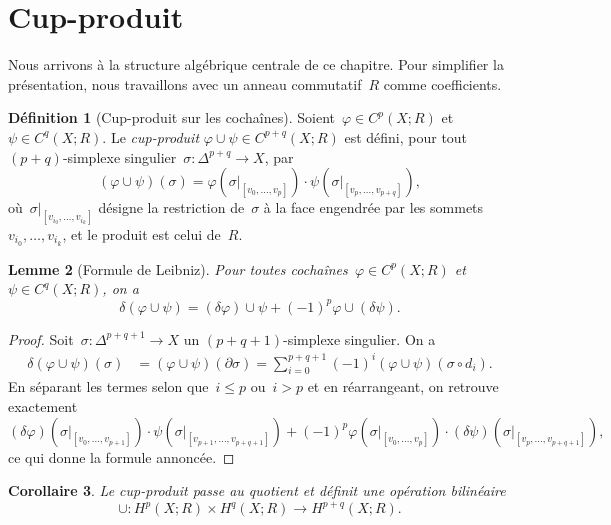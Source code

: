 \documentclass[12pt,a4paper,openany]{book}
\theoremstyle{definition}
\newtheorem{definition}{Définition}[chapter]
\theoremstyle{plain}
\newtheorem{lemme}[definition]{Lemme}
\newtheorem{corollaire}[definition]{Corollaire}
\theoremstyle{remark}
\begin{document}
\section{Cup-produit}\label{sec:cup-produit}

Nous arrivons à la structure algébrique centrale de ce chapitre. Pour simplifier la
présentation, nous travaillons avec un anneau commutatif~$R$ comme coefficients.

\begin{definition}[Cup-produit sur les cochaînes]\label{def:cup-cochaines}
Soient~$\varphi \in C^p(X; R)$ et~$\psi \in C^q(X; R)$. Le \emph{cup-produit}
$\varphi \cup \psi \in C^{p+q}(X; R)$ est défini, pour tout $(p+q)$-simplexe
singulier~$\sigma \colon \Delta^{p+q} \to X$, par
\[
  (\varphi \cup \psi)(\sigma)
  = \varphi(\sigma|_{[v_0, \ldots, v_p]}) \cdot \psi(\sigma|_{[v_p, \ldots, v_{p+q}]}),
\]
où~$\sigma|_{[v_{i_0}, \ldots, v_{i_k}]}$ désigne la restriction de~$\sigma$ à la face
engendrée par les sommets~$v_{i_0}, \ldots, v_{i_k}$, et le produit est celui de~$R$.
\end{definition}

\begin{lemme}[Formule de Leibniz]\label{lem:leibniz-cup}
Pour toutes cochaînes~$\varphi \in C^p(X; R)$ et~$\psi \in C^q(X; R)$, on a
\[
  \delta(\varphi \cup \psi) = (\delta\varphi) \cup \psi
  + (-1)^p \varphi \cup (\delta\psi).
\]
\end{lemme}

\begin{proof}
Soit~$\sigma \colon \Delta^{p+q+1} \to X$ un $(p+q+1)$-simplexe singulier. On a
\begin{align*}
  \delta(\varphi \cup \psi)(\sigma)
  &= (\varphi \cup \psi)(\partial \sigma)
  = \sum_{i=0}^{p+q+1} (-1)^i (\varphi \cup \psi)(\sigma \circ d_i).
\end{align*}
En séparant les termes selon que~$i \leqslant p$ ou~$i > p$ et en réarrangeant, on
retrouve exactement
\[
  (\delta\varphi)(\sigma|_{[v_0,\ldots,v_{p+1}]}) \cdot \psi(\sigma|_{[v_{p+1},\ldots,v_{p+q+1}]})
  + (-1)^p \varphi(\sigma|_{[v_0,\ldots,v_p]}) \cdot (\delta\psi)(\sigma|_{[v_p,\ldots,v_{p+q+1}]}),
\]
ce qui donne la formule annoncée.
\end{proof}

\begin{corollaire}\label{cor:cup-bien-defini}
Le cup-produit passe au quotient et définit une opération bilinéaire
\[
  \cup \colon H^p(X; R) \times H^q(X; R) \longrightarrow H^{p+q}(X; R).
\]
\end{corollaire}
\end{document}
